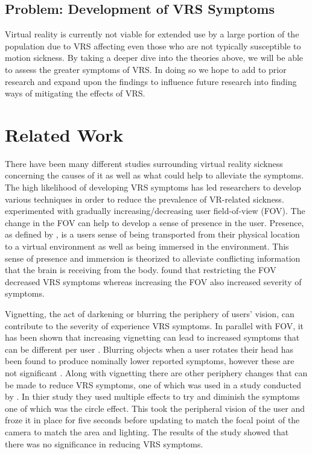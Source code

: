 \documentclass[sigconf]{acmart}
\begin{document}
\subsection{Problem: Development of VRS Symptoms}
Virtual reality is currently not viable for extended use by a large portion of the population due to VRS affecting even those who are not typically susceptible to motion sickness. By taking a deeper dive into the theories above, we will be able to assess the greater symptoms of VRS. In doing so we hope to add to prior research and expand upon the findings to influence future research into finding ways of mitigating the effects of VRS.

\section{Related Work}
There have been many different studies surrounding virtual reality sickness concerning the causes of it as well as what could help to alleviate the symptoms. The high likelihood of developing VRS symptoms has led researchers to develop various techniques in order to reduce the prevalence of VR-related sickness. \cite{teixeira21, fernandes16,shi21} experimented with gradually increasing/decreasing user field-of-view (FOV). The change in the FOV can help to develop a sense of presence in the user. Presence, as defined by \cite{weech19}, is a users sense of being transported from their physical location to a virtual environment as well as being immersed in the environment. This sense of presence and immersion is theorized to alleviate conflicting information that the brain is receiving from the body. \cite{fernandes16, teixeira21} found that restricting the FOV decreased VRS symptoms whereas increasing the FOV also increased severity of symptoms.

Vignetting, the act of darkening or blurring the periphery of users' vision, can contribute to the severity of experience VRS symptoms. In parallel with FOV, it has been shown that increasing vignetting can lead to increased symptoms that can be different per user \cite{norouzi18}. Blurring objects when a user rotates their head has been found to produce nominally lower reported symptoms, however these are not significant \cite{budhiraja17}. Along with vignetting there are other periphery changes that can be made to reduce VRS symptoms, one of which was used in a study conducted by \cite{buhler18}. In thier study they used multiple effects to try and diminish the symptoms one of which was the circle effect. This took the peripheral vision of the user and froze it in place for five seconds before updating to match the focal point of the camera to match the area and lighting. The results of the study showed that there was no significance in reducing VRS symptoms.
\end{document}
